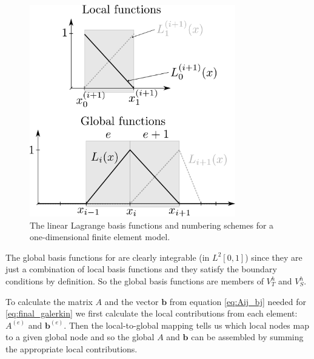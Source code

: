 \begin{figure}
  \center
  \includegraphics[width=0.8\textwidth]{./images/local_global_functions}
  \caption{The linear Lagrange basis functions and numbering schemes for a one-dimensional
    finite element model.\label{fig:local_global_functions}}
\end{figure}

The global basis functions for are clearly integrable (\ie in $L^2[0,1]$) since
they are just a combination of local basis functions and they satisfy the boundary conditions by definition. So the global basis functions are members of $V_T^h$ and $V_S^h$.

To calculate the matrix $A$ and the vector $\mathbf{b}$ from equation
\eqref{eq:Aij_bj} needed for \eqref{eq:final_galerkin} we first calculate the
local contributions from each element: $A^{(e)}$ and $\mathbf{b}^{(e)}$. Then the
local-to-global mapping tells us which local nodes map to a given global node
and so the global $A$ and $\mathbf{b}$ can be assembled by summing the
appropriate local contributions.

